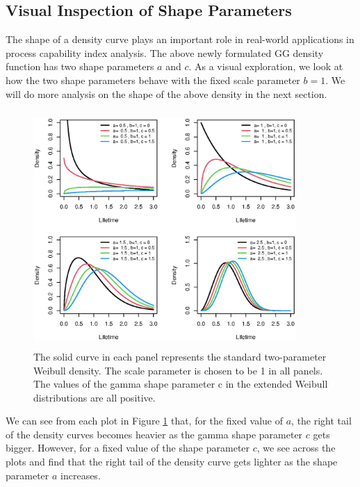 \documentclass{ps}
\theoremstyle{plain}%
\theoremstyle{definition}
\theoremstyle{remark}
\begin{document}
\subsection{Visual Inspection of Shape Parameters}\label{visualizing-shape-parameters}


The shape of a density curve plays an important role in real-world applications in process capability index analysis. The above newly formulated GG density function has two shape parameters $a$ and $c$. As a visual exploration, we look at how the two shape parameters behave with the fixed scale parameter $b = 1$. We will do more analysis on the shape of the above density in the next section.   



\begin{figure}[h!]
	\centering \includegraphics[width=10cm,height=9cm]{Figure01_pos_c_val.eps}
	\caption{The solid curve in each panel represents the standard two-parameter Weibull density. The scale parameter is chosen to be 1 in all panels. The values of the gamma shape parameter c in the extended Weibull distributions are all positive.}
	\label{fig01:Figure01_pos_c.eps}
\end{figure}

We can see from each plot in Figure \ref{fig01:Figure01_pos_c.eps} that, for the fixed value of $a$, the right tail of the density curves becomes heavier as the gamma shape parameter $c$ gets bigger. However, for a fixed value of the shape parameter $c$, we see across the plots and find that the right tail of the density curve gets lighter as the shape parameter $a$ increases. 
\end{document}
